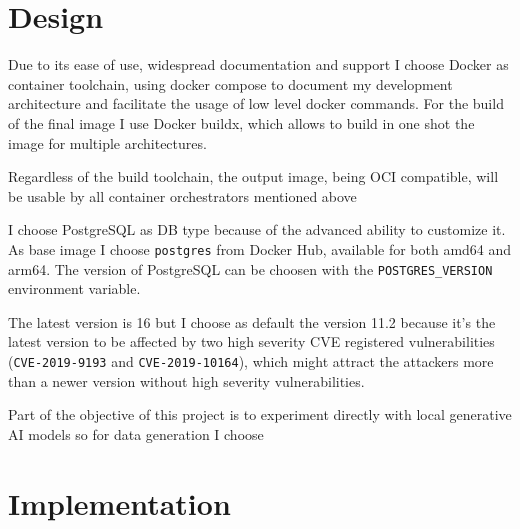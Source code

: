 \documentclass[12pt, letterpaper, twoside]{article}
\begin{document}
\section{Design}
\label{sec:design}

Due to its ease of use, widespread documentation and support I choose Docker as container toolchain, using docker compose to document my development architecture and facilitate the usage of low level docker commands. For the build of the final image I use Docker buildx, which allows to build in one shot the image for multiple architectures.

Regardless of the build toolchain, the output image, being OCI compatible, will be usable by all container orchestrators mentioned above

I choose PostgreSQL as DB type because of the advanced ability to customize it.
As base image I choose \verb|postgres| from Docker Hub, available for both amd64 and arm64.
The version of PostgreSQL can be choosen with the \verb|POSTGRES_VERSION| environment variable.

The latest version is 16 but I choose as default the version 11.2 because it's the latest version to be affected by two high severity CVE registered vulnerabilities (\verb|CVE-2019-9193| and \verb|CVE-2019-10164|), which might attract the attackers more than a newer version without high severity vulnerabilities.

Part of the objective of this project is to experiment directly with local generative AI models so for data generation I choose

\section{Implementation}
\label{sec:implementation}
\end{document}
